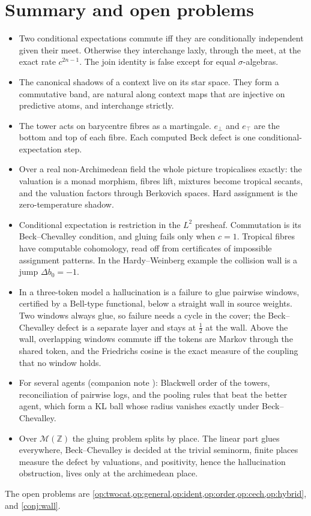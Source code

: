 \documentclass[11pt]{article}
\theoremstyle{definition}
\newcommand{\ebot}{e_{\perp}}
\newcommand{\etop}{e_{\top}}
\begin{document}
\section{Summary and open problems}
\begin{itemize}
\item Two conditional expectations commute iff they are conditionally independent given their meet. Otherwise they interchange laxly,
  through the meet, at the exact rate $c^{2n-1}$. The join identity is false except for equal $\sigma$-algebras.
\item The canonical shadows of a context live on its star space. They form a commutative band, are natural along context maps that are
  injective on predictive atoms, and interchange strictly.
\item The tower acts on barycentre fibres as a martingale. $\ebot$ and $\etop$ are the bottom and top of each fibre. Each computed Beck
  defect is one conditional-expectation step.
\item Over a real non-Archimedean field the whole picture tropicalises exactly: the valuation is a monad morphism, fibres lift,
  mixtures become tropical secants, and the valuation factors through Berkovich spaces. Hard assignment is the zero-temperature
  shadow.
\item Conditional expectation is restriction in the $L^2$ presheaf. Commutation is its Beck--Chevalley condition, and gluing fails only
  when $c=1$. Tropical fibres have computable cohomology, read off from certificates of impossible assignment patterns. In the
  Hardy--Weinberg example the collision wall is a jump $\Delta b_0=-1$.
\item In a three-token model a hallucination is a failure to glue pairwise windows, certified by a Bell-type functional, below a
  straight wall in source weights. Two windows always glue, so failure needs a cycle in the cover; the Beck--Chevalley defect is a
  separate layer and stays at $\tfrac12$ at the wall. Above the wall, overlapping windows commute iff the tokens are Markov through the
  shared token, and the Friedrichs cosine is the exact measure of the coupling that no window holds.
\item For several agents (companion note \cite{PoolingNote2}): Blackwell order of the towers, reconciliation of pairwise logs, and the
  pooling rules that beat the better agent, which form a KL ball whose radius vanishes exactly under Beck--Chevalley.
\item Over $\mathcal{M}(\mathbb{Z})$ the gluing problem splits by place. The linear part glues everywhere, Beck--Chevalley is decided
  at the trivial seminorm, finite places measure the defect by valuations, and positivity, hence the hallucination obstruction, lives
  only at the archimedean place.
\end{itemize}
The open problems are \cref{op:twocat,op:general,op:ident,op:order,op:cech,op:hybrid}, and \cref{conj:wall}.
\end{document}
